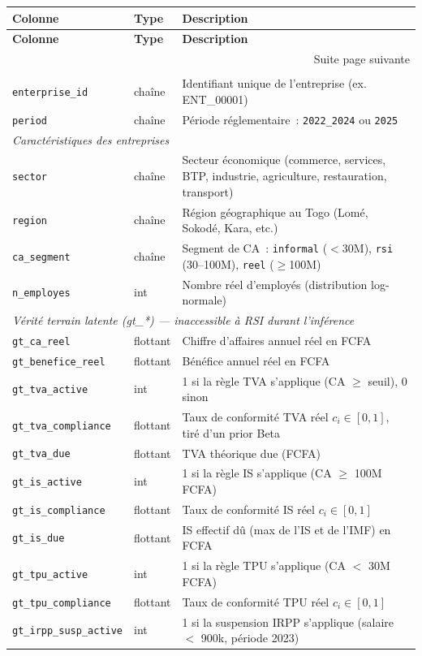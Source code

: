 \documentclass[letterpaper]{article}
\begin{document}
\begin{longtable}{lp{2.2cm}p{7.5cm}}
\toprule
\textbf{Colonne} & \textbf{Type} & \textbf{Description} \\
\midrule
\endfirsthead
\toprule
\textbf{Colonne} & \textbf{Type} & \textbf{Description} \\
\midrule
\endhead
\midrule
\multicolumn{3}{r}{\small Suite page suivante} \\
\endfoot
\bottomrule
\endlastfoot

\multicolumn{3}{l}{\textit{Identifiants}} \\[2pt]
\texttt{enterprise\_id} & cha\^ine & Identifiant unique de l'entreprise (ex. ENT\_00001) \\
\texttt{period} & cha\^ine & P\'eriode r\'eglementaire~: \texttt{2022\_2024} ou \texttt{2025} \\[6pt]

\multicolumn{3}{l}{\textit{Caract\'eristiques des entreprises}} \\[2pt]
\texttt{sector} & cha\^ine & Secteur \'economique (commerce, services, BTP, industrie, agriculture, restauration, transport) \\
\texttt{region} & cha\^ine & R\'egion g\'eographique au Togo (Lom\'e, Sokod\'e, Kara, etc.) \\
\texttt{ca\_segment} & cha\^ine & Segment de CA~: \texttt{informal} ($<$30M), \texttt{rsi} (30--100M), \texttt{reel} ($\geq$100M) \\
\texttt{n\_employes} & int & Nombre r\'eel d'employ\'es (distribution log-normale) \\[6pt]

\multicolumn{3}{l}{\textit{V\'erit\'e terrain latente (gt\_*) --- inaccessible \`a RSI durant l'inf\'erence}} \\[2pt]
\texttt{gt\_ca\_reel} & flottant & Chiffre d'affaires annuel r\'eel en FCFA \\
\texttt{gt\_benefice\_reel} & flottant & B\'en\'efice annuel r\'eel en FCFA \\
\texttt{gt\_tva\_active} & int & 1 si la r\`egle TVA s'applique (CA $\geq$ seuil), 0 sinon \\
\texttt{gt\_tva\_compliance} & flottant & Taux de conformit\'e TVA r\'eel $c_i \in [0,1]$, tir\'e d'un prior Beta \\
\texttt{gt\_tva\_due} & flottant & TVA th\'eorique due (FCFA) \\
\texttt{gt\_is\_active} & int & 1 si la r\`egle IS s'applique (CA $\geq$ 100M FCFA) \\
\texttt{gt\_is\_compliance} & flottant & Taux de conformit\'e IS r\'eel $c_i \in [0,1]$ \\
\texttt{gt\_is\_due} & flottant & IS effectif d\^u (max de l'IS et de l'IMF) en FCFA \\
\texttt{gt\_tpu\_active} & int & 1 si la r\`egle TPU s'applique (CA $<$ 30M FCFA) \\
\texttt{gt\_tpu\_compliance} & flottant & Taux de conformit\'e TPU r\'eel $c_i \in [0,1]$ \\
\texttt{gt\_irpp\_susp\_active} & int & 1 si la suspension IRPP s'applique (salaire $<$ 900k, p\'eriode 2023) \\[6pt]


\end{longtable}
\end{document}
